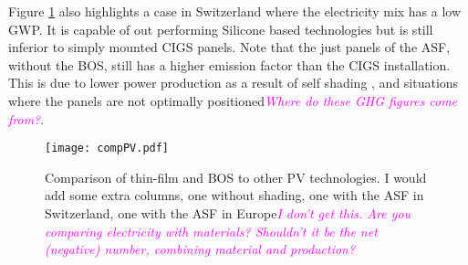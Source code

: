 Figure \ref{fig:compPV} also highlights a case in Switzerland where the electricity mix has a low GWP. It is capable of out performing Silicone based technologies but is still inferior to simply mounted CIGS panels. Note that the just panels of the ASF, without the BOS, still has a higher emission factor than the CIGS installation. This is due to lower power production as a result of self shading \cite{hofer2015photovoltaics}, and situations where the panels are not optimally positioned\textcolor{magenta}{\textit{Where do these GHG figures come from?}}.

\begin{figure}[H]
\begin{center}
\texttt{[image: compPV.pdf]}
\caption{Comparison of thin-film and BOS to other PV technologies. I would add some extra columns, one without shading, one with the ASF in Switzerland, one with the ASF in Europe\textcolor{magenta}{\textit{I don't get this. Are you comparing electricity with materials? Shouldn't it be the net (negative) number, combining material and production?}}}
\label{fig:compPV}
\end{center}
\end{figure}






